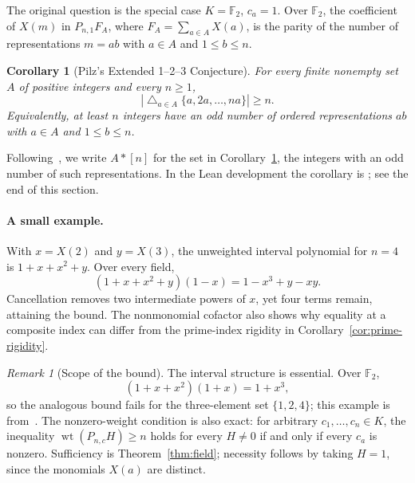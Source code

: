 \documentclass[11pt]{article}
\DeclareMathOperator{\wt}{wt}\DeclareMathOperator{\ord}{ord}
\numberwithin{equation}{section}
\newtheorem{corollary}[theorem]{Corollary}
\theoremstyle{definition}\newtheorem{definition}[theorem]{Definition}
\theoremstyle{remark}\newtheorem{remark}[theorem]{Remark}
\begin{document}
The original question is the special case $K=\mathbb F_2$, $c_a=1$.
Over $\mathbb F_2$, the coefficient of $X(m)$ in $P_{n,1}F_A$, where
$F_A=\sum_{a\in A}X(a)$, is the parity of the number of
representations $m=ab$ with $a\in A$ and $1\le b\le n$.

\begin{corollary}[Pilz's Extended 1--2--3 Conjecture]\label{cor:pilz}
For every finite nonempty set $A$ of positive integers and every $n\ge1$,
\[
 \left|\mathop{\triangle}_{a\in A}\{a,2a,\ldots,na\}\right|
 \ge n .
\]
Equivalently, at least $n$ integers have an odd number of ordered
representations $ab$ with $a\in A$ and $1\le b\le n$.
\end{corollary}

Following~\cite{HP}, we write $A*[n]$ for the set in
Corollary~\ref{cor:pilz}, the integers with an odd number of such
representations. In the Lean development the corollary is
; see the end of this
section.

\paragraph{A small example.}
With $x=X(2)$ and $y=X(3)$, the unweighted interval polynomial for
$n=4$ is $1+x+x^2+y$. Over every field,
\[
 (1+x+x^2+y)(1-x)=1-x^3+y-xy.
\]
Cancellation removes two intermediate powers of $x$, yet four terms
remain, attaining the bound. The nonmonomial cofactor also shows why
equality at a composite index can differ from the prime-index rigidity
in Corollary~\ref{cor:prime-rigidity}.

\begin{remark}[Scope of the bound]\label{rem:scope}
The interval structure is essential. Over $\mathbb F_2$,
\[
 (1+x+x^2)(1+x)=1+x^3,
\]
so the analogous bound fails for the three-element set $\{1,2,4\}$; this
example is from~\cite[\S1]{HP}.
The nonzero-weight condition is also exact: for arbitrary
$c_1,\ldots,c_n\in K$, the inequality
$\wt(P_{n,c}H)\ge n$ holds for every $H\ne0$ if and only if
every $c_a$ is nonzero. Sufficiency is Theorem~\ref{thm:field};
necessity follows by taking $H=1$, since the monomials $X(a)$ are distinct.
\end{remark}
\end{document}
